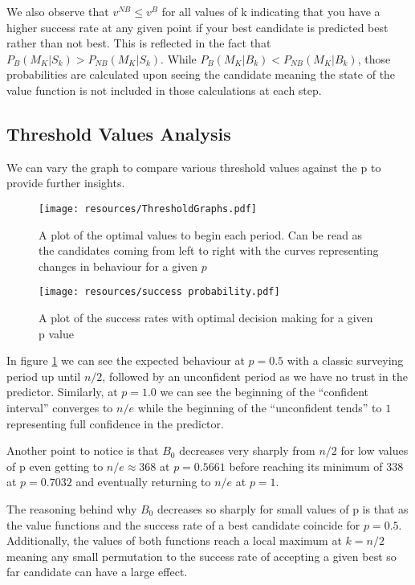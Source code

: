 \documentclass[a4paper,11pt]{article}
\begin{document}
We also observe that $v^{NB} \le v^B$ for all values of k indicating that you have a higher success rate at any given point if your best candidate is predicted best rather than not best. This is reflected in the fact that $P_B(M_K|S_k) > P_{NB}(M_K|S_k)$. While $P_B(M_K|B_k) < P_{NB}(M_K|B_k)$, those probabilities are calculated upon seeing the candidate meaning the state of the value function is not included in those calculations at each step.

\subsection{Threshold Values Analysis}

We can vary the graph to compare various threshold values against the p to provide further insights. 

\begin{figure}[H]
    \centering
    \texttt{[image: resources/ThresholdGraphs.pdf]}
    \caption{A plot of the optimal values to begin each period. Can be read as the candidates coming from left to right with the curves representing changes in behaviour for a given $p$}
    \label{fig:thresholdgraph}
\end{figure}

\begin{figure}[H]
    \centering
    \texttt{[image: resources/success probability.pdf]}
    \caption{A plot of the success rates with optimal decision making for a given p value}
    \label{fig:successGraph}
\end{figure}


In figure \ref{fig:thresholdgraph} we can see the expected behaviour at $p = 0.5$ with a classic surveying period up until $n/2$, followed by an unconfident period as we have no trust in the predictor. Similarly, at $p = 1.0$ we can see the beginning of the ``confident interval'' converges to $n/e$ while the beginning of the ``unconfident tends'' to $1$ representing full confidence in the predictor.

Another point to notice is that $B_0$ decreases very sharply from $n/2$ for low values of p even getting to $n/e\approx368$ at $p = 0.5661$ before reaching its minimum of $338$ at $p=0.7032$ and eventually returning to $n/e$ at $p=1$.

The reasoning behind why $B_0$ decreases so sharply for small values of p is that as the value functions and the success rate of a best candidate coincide for $p=0.5$. Additionally, the values of both functions reach a local maximum at $k = n/2$ meaning any small permutation to the success rate of accepting a given best so far candidate can have a large effect.
\end{document}
